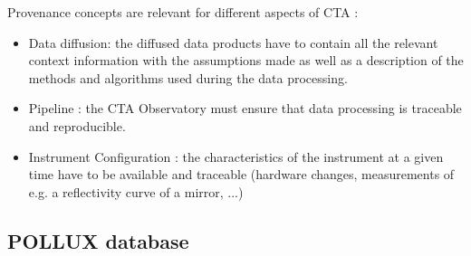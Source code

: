 Provenance concepts are relevant for different aspects of CTA :
\begin{itemize}
\item Data diffusion: the diffused data products have to contain all the relevant context information with the assumptions made as well as a description of the methods and algorithms used during the data processing.
\item Pipeline : the CTA Observatory must ensure that data processing is traceable and reproducible.
\item Instrument Configuration : the characteristics of the instrument at a given time have to be available and traceable (hardware changes, measurements of e.g. a reflectivity curve of a mirror, ...)
\end{itemize}


\subsection{POLLUX database}


 